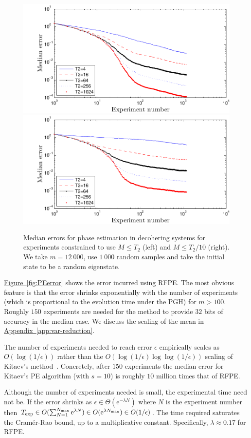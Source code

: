 \documentclass[aps,pra,amsmath,twocolumn,amssymb,superscriptaddress]{revtex4-1}
\newcommand{\app}[1]{\hyperref[app:#1]{Appendix~\ref*{app:#1}}}
\newcommand{\fig}[1]{\hyperref[fig:#1]{Figure~\ref*{fig:#1}}}
\newcommand{\ee}{\mathrm{e}}
\begin{document}
\begin{figure}
    \begin{centering}
\includegraphics[width=0.45\linewidth]{T2plot_full.pdf}
        \includegraphics[width=0.45\linewidth]{T2plot.pdf}
    \end{centering}
    \caption{\label{fig:T2plot}
Median errors for phase estimation in decohering systems for experiments constrained to use $M\le T_2$ (left) and $M\le T_2/10$ (right).  We take $m=12~000$, use $1~000$ random samples and take the initial state  to be a random eigenstate.
    }
\end{figure}

\fig{PEerror} shows the error incurred using RFPE.  The most obvious feature is that the error shrinks exponentially with the number of experiments (which is proportional to the evolution time under the PGH) for $m>100$.  Roughly $150$ experiments are needed for the method to provide $32$ bits of accuracy in the median case.
We discuss the scaling of the mean in \app{var-reduction}.

The number of experiments needed to reach error $\epsilon$ empirically scales as $O(\log(1/\epsilon))$ rather than the $O(\log(1/\epsilon)\log\log(1/\epsilon))$ scaling of Kitaev's method~\cite{Kit96,kitaev2002classical}.  Concretely, after $150$ experiments the median error for Kitaev's PE algorithm (with $s=10$) is roughly $10$ million times that of RFPE.

Although the number of experiments needed is small, the experimental time need
not be.  If the error shrinks as $\epsilon\in \Theta(\ee^{-\lambda N})$ where
$N$ is the experiment number then $T_{\exp}\in O(\sum_{N=1}^{N_{\max}} \ee^{\lambda N})\in O(\ee^{\lambda N_{\rm max}})\in O(1/\epsilon)$.  The
time required saturates the Cram\'er-Rao bound, up to a multiplicative constant.
Specifically, $\lambda\approx 0.17$ for RFPE.
\end{document}
